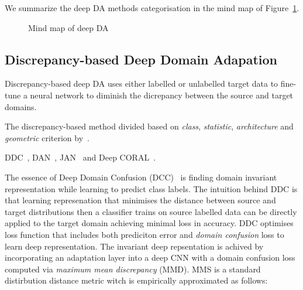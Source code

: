 We summarize the deep DA methods categorisation in the mind map of Figure~\ref{mind_map}.

\begin{figure}
	\caption{Mind map of deep DA}
	\label{mind_map}
\end{figure}

\subsection{Discrepancy-based Deep Domain Adapation}

Discrepancy-based deep DA uses either labelled or unlabelled target data
to fine-tune a neural network to diminish the dicrepancy
between the source and target domains.

The discrepancy-based method divided based on
\textit{class}, \textit{statistic}, \textit{architecture} and \textit{geometric}
criterion by~\cite{wang2018}.

DDC~\cite{tzeng2014}, DAN~\cite{long2015}, JAN~\cite{long2017}
and Deep CORAL~\cite{sun2016}.

The essence of Deep Domain Confusion (DCC)~\cite{tzeng2014} is finding domain invariant representation
while learning to predict class labels.
The intuition behind DDC is that learning represenation
that minimises the distance between source and target distributions
then a classifier trains on source labelled data
can be directly applied to the target domain achieving minimal loss in accuracy.
DDC optimises loss function that includes both prediciton error and \textit{domain confusion} loss to learn deep representation.
The invariant deep repsentation is achived by incorporating an adaptation layer
into a deep CNN with a domain confusion loss computed via \textit{maximum mean discrepancy} (MMD).
MMS is a standard distirbution distance metric
witch is empirically approximated as follows:

